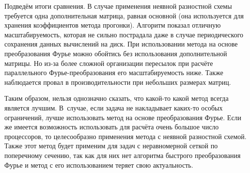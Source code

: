 
\newpage

Подведём итоги сравнения. В случае применения неявной разностной схемы требуется одна дополнительная матрица,
равная основной (она используется для хранения коэффициентов метода прогонки). Алгоритм показал отличную
масштабируемость, которая не сильно пострадала даже в случае периодического сохранения данных вычислений на диск.
При использовании метода на основе преобразования Фурье можно обойтись без использования дополнительной матрицы.
Но из-за более сложной организации пересылок при расчёте параллельного Фурье-преобразования
его масштабируемость ниже. Также наблюдается провал в производительности при небольших размерах матриц.


Таким образом, нельзя однозначно сказать, что какой-то какой метод всегда является лучшим.
В~случае, если задача не накладывает каких-то особых ограничений, лучше использовать метод на основе преобразования Фурье.
Если же имеется возможность использовать для расчёта очень большое число процессоров,
то целесообразно применения метода с неявной разностной схемой. Также этот метод будет применим
для задач с неравномерной сеткой по поперечному сечению, так как для них нет алгоритма
быстрого преобразования Фурье и метод с его использованием теряет свою актуальность.


